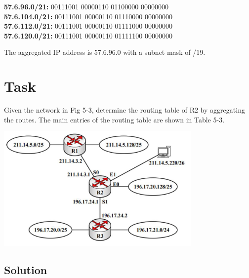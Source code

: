 \documentclass[11pt]{article}
\begin{document}
    \begin{center}
        \textbf{57.6.96.0/21:} 00111001 \hspace{3} 00000110 \hspace{3}01100000 \hspace{3}00000000 \\
        \textbf{57.6.104.0/21:} 00111001 \hspace{3} 00000110 \hspace{3}01110000 \hspace{3}00000000 \\
        \textbf{57.6.112.0/21:} 00111001 \hspace{3} 00000110 \hspace{3}01111000 \hspace{3}00000000 \\
        \textbf{57.6.120.0/21:} 00111001 \hspace{3}00000110 \hspace{3}01111100 \hspace{3}00000000 \\
    \end{center}

    The aggregated IP address is 57.6.96.0 with a subnet mask of /19.
    \newpage


    \section{Task}
    Given the network in Fig 5-3, determine the routing table of R2 by aggregating the routes.
    The main entries of the routing table are shown in Table 5-3.

     \begin{center}
        \includegraphics[width=0.75\textwidth]{figs/task8}
    \end{center}

    \subsection{Solution}
\end{document}
